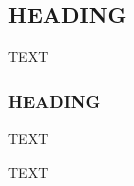 \documentclass[esd, article]{copernicus}
\begin{document}
\subsection{HEADING}
TEXT


\subsubsection{HEADING}
TEXT


\conclusions  %
TEXT












\appendix
\section{}    %

\subsection{}     %


\noappendix       %


\end{document}
